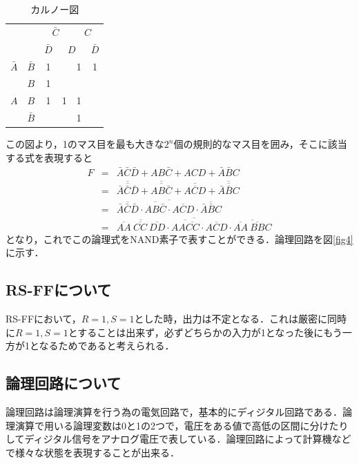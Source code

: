 \documentclass[11pt,a4paper]{jsarticle}
\begin{document}
\begin{table}[hb]
 \begin{center}
  \begin{tabular}{|c|c|c|c|c|c|} \hline
   &&\multicolumn{2}{|c|}{$\bar C$} & \multicolumn{2}{|c|}{$C$} \\ \cline{3-6} 
   &&$\bar D$ & \multicolumn{2}{|c|}{$D$} & $\bar D$  \\ \hline
   $\bar A$ &$\bar B$& 1 &   & 1 & 1 \\ \cline{2-6}
            &$B$     & 1 &   &   &   \\ \hline
   $A$      &$B$     & 1 & 1 & 1 &   \\ \cline{2-6}
            &$\bar B$&   &   & 1 &   \\ \hline
  \end{tabular}
  \caption{カルノー図}
  \label{tab3}
 \end{center}
\end{table}

この図より，1のマス目を最も大きな$2^n$個の規則的なマス目を囲み，そこに該当する式を表現すると
\begin{eqnarray*}
 F & = & \bar A \bar C \bar D + AB\bar C + ACD + \bar A \bar B C \\
   & = & \overline{\overline{\bar A \bar C \bar D}} + \overline{\overline{AB \bar C}} + \overline{\overline{ACD}} + \overline{\overline{\bar A \bar B C}} \\
   & = & \overline{\overline{\bar A \bar C \bar D} \cdot \overline{AB \bar C} \cdot \overline{ACD} \cdot \overline{\bar A \bar B C}} \\
   & = & \overline{\overline{\overline{AA} \  \overline{CC} \  \overline{DD}} \cdot \overline{AA \overline{CC}} \cdot \overline{ACD} \cdot \overline{\overline{AA} \ \overline{BB} C}}
\end{eqnarray*}
となり，これでこの論理式をNAND素子で表すことができる．論理回路を図\ref{fig4}に示す．


\newpage
\thispagestyle{fancy}
\cfoot{}

\newpage

\subsection{RS-FFについて}
RS-FFにおいて，$R = 1,S = 1$とした時，出力は不定となる．これは厳密に同時に$R = 1,S = 1$とすることは出来ず，必ずどちらかの入力が1となった後にもう一方が1となるためであると考えられる．

  \subsection{論理回路について}
論理回路は論理演算を行う為の電気回路で，基本的にディジタル回路である．論理演算で用いる論理変数は0と1の2つで，電圧をある値で高低の区間に分けたりしてディジタル信号をアナログ電圧で表している．論理回路によって計算機などで様々な状態を表現することが出来る．
\end{document}
